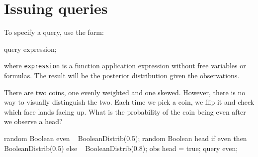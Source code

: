 \documentclass[12pt]{article}
\begin{document}
\section{Issuing queries}
To specify a query, use the form:
\begin{blogcode}
query expression;
\end{blogcode}
where \texttt{expression} is a function application expression without free variables or formulas. The result will be the posterior distribution given the observations. 

\begin{example}
There are two coins, one evenly weighted and one skewed. However, there is no way to visually distinguish the two. Each time we pick a coin, we flip it and check which face lands facing up. What is the probability of the coin being even after we observe a head?
\end{example}
\begin{blogcode}
random Boolean even ~ BooleanDistrib(0.5);
random Boolean head 
  if even then ~ BooleanDistrib(0.5)
  else ~ BooleanDistrib(0.8);
obs head = true;
query even;
\end{blogcode}
\end{document}
